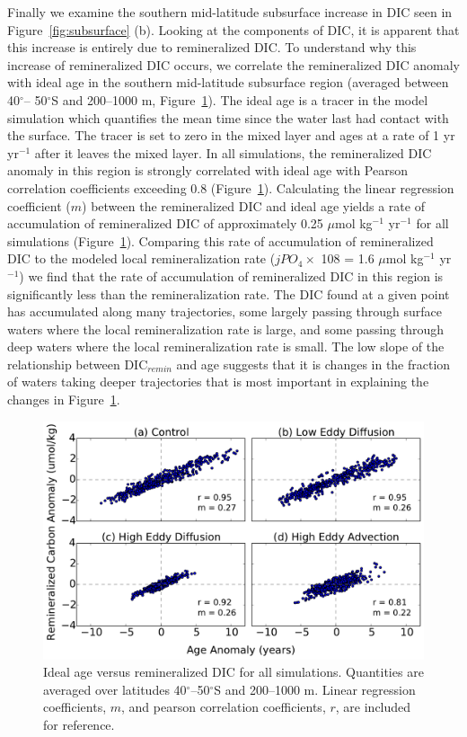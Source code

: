 Finally we examine the southern mid-latitude subsurface increase in DIC seen in
Figure~\ref{fig:subsurface} (b). Looking at the components of DIC, it is apparent that this
increase is entirely due to remineralized DIC. To understand why this increase
of remineralized DIC occurs, we correlate the remineralized DIC anomaly with ideal age
in the southern mid-latitude subsurface region (averaged between 40$^\circ{}$--
50$^\circ{}$S and 200--1000 m, Figure~\ref{fig:dic_remin_vs_age}). The ideal age
is a tracer in the model simulation which quantifies the mean time since the
water last had contact with the surface. The tracer is set to zero in the mixed
layer and ages at a rate of 1 yr yr$^{-1}$ after it leaves the mixed layer.
In all simulations, the remineralized DIC anomaly in this region is strongly correlated
with ideal age with Pearson
correlation coefficients exceeding 0.8 (Figure~\ref{fig:dic_remin_vs_age}).
Calculating the linear regression coefficient ($m$) between the remineralized
DIC and ideal age yields a rate of accumulation of remineralized DIC of
approximately 0.25 $\mu$mol kg$^{-1}$ yr$^{-1}$ for all simulations
(Figure~\ref{fig:dic_remin_vs_age}).
Comparing this rate of accumulation of remineralized DIC to the modeled local
remineralization rate ($jPO_4 \times$ 108 = 1.6 $\mu$mol kg$^{-1}$ yr$^{-1}$) we find that
the rate of accumulation of remineralized DIC in this region is significantly
less than the remineralization rate. The DIC found at a given point has
accumulated along many trajectories, some largely passing through surface waters
where the local remineralization rate is large, and some passing through deep
waters where the local remineralization rate is small. The low slope of the
relationship between DIC$_{remin}$ and age suggests that it is changes in the
fraction of waters taking deeper trajectories that is most important in
explaining the changes in Figure~\ref{fig:dic_remin_vs_age}.

\begin{figure}
\noindent
\centering
\includegraphics[width=33pc]{figure11.pdf}
\caption{Ideal age versus remineralized DIC for all simulations. Quantities are
averaged over latitudes 40$^{\circ}$--50$^{\circ}$S and 200--1000 m. Linear
regression coefficients, $m$, and pearson correlation coefficients, $r$, are
included for reference. }
\label{fig:dic_remin_vs_age}
\end{figure}

